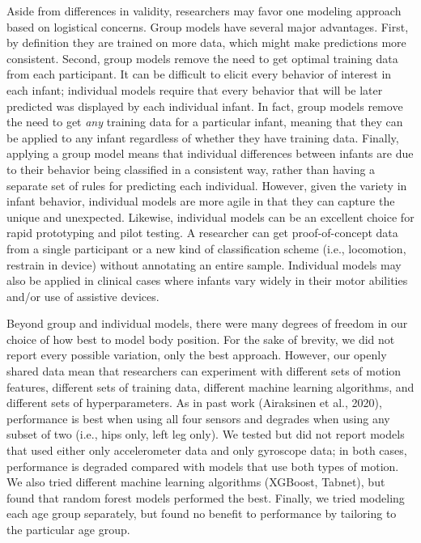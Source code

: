 \documentclass[
  man]{apa6}
\begin{document}
Aside from differences in validity, researchers may favor one modeling approach based on logistical concerns. Group models have several major advantages. First, by definition they are trained on more data, which might make predictions more consistent. Second, group models remove the need to get optimal training data from each participant. It can be difficult to elicit every behavior of interest in each infant; individual models require that every behavior that will be later predicted was displayed by each individual infant. In fact, group models remove the need to get \emph{any} training data for a particular infant, meaning that they can be applied to any infant regardless of whether they have training data. Finally, applying a group model means that individual differences between infants are due to their behavior being classified in a consistent way, rather than having a separate set of rules for predicting each individual. However, given the variety in infant behavior, individual models are more agile in that they can capture the unique and unexpected. Likewise, individual models can be an excellent choice for rapid prototyping and pilot testing. A researcher can get proof-of-concept data from a single participant or a new kind of classification scheme (i.e., locomotion, restrain in device) without annotating an entire sample. Individual models may also be applied in clinical cases where infants vary widely in their motor abilities and/or use of assistive devices.

Beyond group and individual models, there were many degrees of freedom in our choice of how best to model body position. For the sake of brevity, we did not report every possible variation, only the best approach. However, our openly shared data mean that researchers can experiment with different sets of motion features, different sets of training data, different machine learning algorithms, and different sets of hyperparameters. As in past work (Airaksinen et al., 2020), performance is best when using all four sensors and degrades when using any subset of two (i.e., hips only, left leg only). We tested but did not report models that used either only accelerometer data and only gyroscope data; in both cases, performance is degraded compared with models that use both types of motion. We also tried different machine learning algorithms (XGBoost, Tabnet), but found that random forest models performed the best. Finally, we tried modeling each age group separately, but found no benefit to performance by tailoring to the particular age group.
\end{document}

